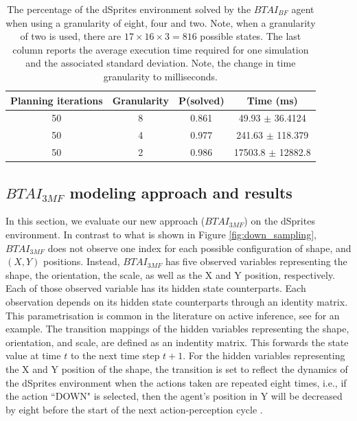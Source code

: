 \documentclass[twoside,11pt]{article}
\begin{document}
\begin{table}[H]
\centering
\begin{tabular}{ |c|c|c|c| }
 \hline
 Planning iterations & Granularity & P(solved) & Time (ms) \\
 \hline
 50 & 8 & 0.861 & 49.93 $\pm$ 36.4124 \\
 \hline
 50 & 4 & 0.977 & 241.63 $\pm$ 118.379 \\
 \hline
 50 & 2 & 0.986 & 17503.8 $\pm$ 12882.8 \\
 \hline
\end{tabular}
\caption{The percentage of the dSprites environment solved by the $BTAI_{BF}$ agent when using a granularity of eight, four and two. Note, when a granularity of two is used, there are $17 \times 16 \times 3 = 816$ possible states. The last column reports the average execution time required for one simulation and the associated standard deviation. Note, the change in time granularity to milliseconds.}
\label{tab:btai_bf_dSprites_res}
\end{table}

\subsection{$BTAI_{3MF}$ modeling approach and results} \label{ssec:btai_3mf}

In this section, we evaluate our new approach ($BTAI_{3MF}$) on the dSprites environment. In contrast to what is shown in Figure \ref{fig:down_sampling}, $BTAI_{3MF}$ does not observe one index for each possible configuration of shape, and $(X, Y)$ positions. Instead, $BTAI_{3MF}$ has five observed variables representing the shape, the orientation, the scale, as well as the X and Y position, respectively. Each of those observed variable has its hidden state counterparts. Each observation depends on its hidden state counterparts through an identity matrix. This parametrisation is common in the literature on active inference, see \citep{10.1162/neco_a_01357} for an example. The transition mappings of the hidden variables representing the shape, orientation, and scale, are defined as an indentity matrix. This forwards the state value at time $t$ to the next time step $t + 1$. For the hidden variables representing the X and Y position of the shape, the transition is set to reflect the dynamics of the dSprites environment when the actions taken are repeated eight times, i.e., if the action ``DOWN" is selected, then the agent's position in Y will be decreased by eight before the start of the next action-perception cycle \citep{DeepAIwithMCMC}.
\end{document}

